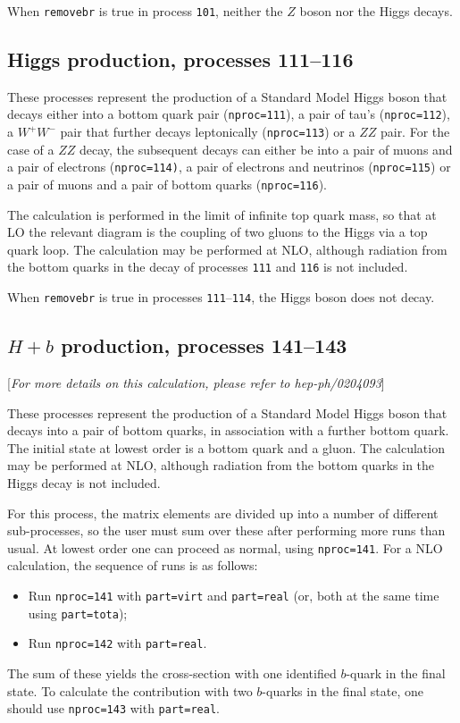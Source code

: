 \documentclass[12pt]{article}
\begin{document}
When {\tt removebr} is true in process {\tt 101}, neither the $Z$ boson
nor the Higgs decays.

\subsection{Higgs production, processes 111--116}
\label{subsec:h}

These processes represent the production of a Standard Model Higgs
boson that decays either into a bottom quark
pair ({\tt nproc=111}), a pair of tau's ({\tt nproc=112}), a $W^+W^-$ pair
that further decays leptonically ({\tt nproc=113}) or a $ZZ$ pair.
For the case of a $ZZ$ decay,
the subsequent decays can either be into a pair of muons and a pair of electrons
({\tt nproc=114)}, a pair of electrons and neutrinos ({\tt nproc=115}) or
a pair of muons and a pair of bottom quarks ({\tt nproc=116}).

The calculation is performed in the
limit of infinite top quark mass, so that at LO the relevant diagram
is the coupling of two gluons to the Higgs via a top quark loop.
The calculation may be performed at NLO, although radiation from the
bottom quarks in the decay of processes {\tt 111} and {\tt 116} is not included.

When {\tt removebr} is true in processes {\tt 111}--{\tt 114},
the Higgs boson does not decay.

\subsection{$H+b$ production, processes 141--143}
\label{subsec:Hb}

\begin{center}
[{\it For more details on this calculation, please refer to hep-ph/0204093}]
\end{center}

These processes represent the production of a Standard Model Higgs
boson that decays into a pair of bottom quarks,
in association with a further bottom quark. The initial state at lowest order
is a bottom quark and a gluon.
The calculation may be performed at NLO, although radiation from the
bottom quarks in the Higgs decay is not included.

For this process, the matrix elements are divided up into a number of
different sub-processes, so the user must sum over these after performing
more runs than usual. At lowest order one can proceed as normal, using
{\tt nproc=141}. For a NLO calculation, the sequence of runs is as follows:
\begin{itemize}
\item Run {\tt nproc=141} with {\tt part=virt} and {\tt part=real} (or, both
at the same time using {\tt part=tota});
\item Run {\tt nproc=142} with {\tt part=real}.
\end{itemize}
The sum of these yields the cross-section with one identified $b$-quark in
the final state. To calculate the contribution with two $b$-quarks in the
final state, one should use {\tt nproc=143} with {\tt part=real}.
\end{document}
